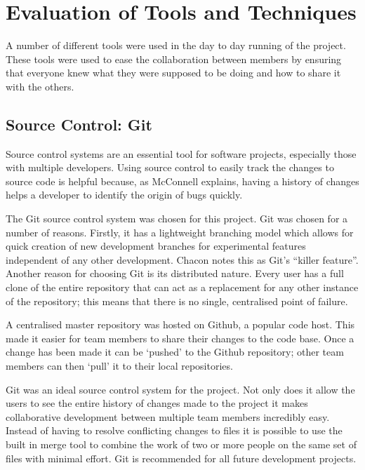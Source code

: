 \section{Evaluation of Tools and Techniques}
\label{section:tools}

A number of different tools were used in the day to day running of the project.
These tools were used to ease the collaboration between members by ensuring that everyone knew
what they were supposed to be doing and how to share it with the others.

\subsection{Source Control: Git}

Source control systems are an essential tool for software projects, especially those
with multiple developers. Using source control to easily track the changes to source
code is helpful because, as McConnell explains, having a history of changes helps a
developer to identify the origin of bugs quickly.

The Git source control system was chosen for this project.
Git was chosen for a number of reasons. Firstly, it has a lightweight branching model which
allows for quick creation of new development branches for experimental features independent of
any other development. Chacon notes this as Git's ``killer feature''.
Another reason for choosing Git is its distributed nature. Every user has a full clone of the
entire repository that can act as a replacement for any other instance of the repository; this means
that there is no single, centralised point of failure.

A centralised master repository was hosted on Github, a popular code host.
This made it easier for team members to share their changes to the code base. Once a change has been made
it can be `pushed' to the Github repository; other team members can then `pull' it to their local
repositories.

Git was an ideal source control system for the project. Not only does it allow the users to see
the entire history of changes made to the project it makes collaborative development between
multiple team members incredibly easy. Instead of having to resolve conflicting changes to files
it is possible to use the built in merge tool to combine the work of two or more people on the
same set of files with minimal effort. Git is recommended for all future development projects.

